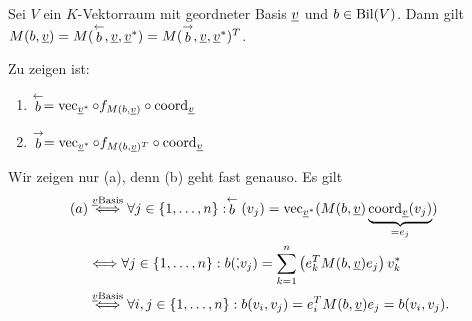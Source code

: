 \documentclass[../../main.tex]{subfiles}
\begin{document}
\begin{pro}\label{13.3.8}
	Sei $V$ ein $K$-Vektorraum mit geordneter Basis ${\underline v}$ und $b\in \operatorname{Bil}(V)$. Dann gilt $M(b,{\underline v})=M(\stackrel{\leftarrow}{b}, {\underline v},{\underline v}^*)=M(\stackrel{\rightarrow}{b},{\underline v},{\underline v}^*)^T$.
\end{pro}
\begin{cproof} Zu zeigen ist:
	\begin{enumerate}[\normalfont (a)]
		\item $\stackrel{\leftarrow}{b}=\operatorname{vec}_{{\underline v}^*}\circ f_{M(b,{\underline v})}\circ \operatorname{coord}_{\underline v}$
		\item $\stackrel{\rightarrow}{b}=\operatorname{vec}_{{\underline v}^*}\circ f_{M(b,{\underline v})^T}\circ \operatorname{coord}_{\underline v}$
	\end{enumerate}
	Wir zeigen nur (a), denn (b) geht fast genauso. Es gilt
	\begin{align*}
		(a)&\stackrel{{\underline v}\text{Basis}}{\Longleftrightarrow}\forall j\in\{1,\ldots ,n\}: \stackrel{\leftarrow}{b}(v_j)=\operatorname{vec}_{{\underline v}^*}(M(b,{\underline v})\underbrace{\operatorname{coord}_{\underline v}(v_j)}_{=e_j})\\
		&\Longleftrightarrow \forall j\in\{1,\ldots ,n\}: b(\dot, v_j)=\sum_{k=1}^n\left(e_k^TM(b,{\underline v})e_j\right)v_k^*\\
		&\stackrel{{\underline v}\text{Basis}}{\Longleftrightarrow}\forall i,j\in\{1,\ldots ,n\}: b(v_i,v_j)=e_i^TM(b,{\underline v})e_j=b(v_i,v_j).
	\end{align*}
\end{cproof}
\end{document}
